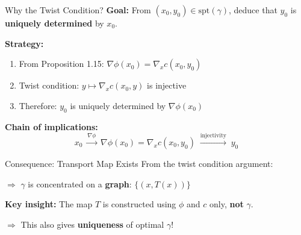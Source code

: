 \documentclass[aspectratio=169]{beamer}
\begin{document}
\begin{frame}{Why the Twist Condition?}
\textbf{Goal:} From $(x_0, y_0) \in \text{spt}(\gamma)$, deduce that $y_0$ is \textbf{uniquely determined} by $x_0$.

\vspace{0.4cm}
\textbf{Strategy:}
\begin{enumerate}
    \item From Proposition 1.15: $\nabla\phi(x_0) = \nabla_x c(x_0, y_0)$
    \item Twist condition: $y \mapsto \nabla_x c(x_0, y)$ is injective
    \item Therefore: $y_0$ is uniquely determined by $\nabla\phi(x_0)$
\end{enumerate}

\vspace{0.4cm}
\textbf{Chain of implications:}
\[
x_0 \;\xrightarrow{\nabla\phi}\; \nabla\phi(x_0) = \nabla_x c(x_0, y_0) \;\xrightarrow{\text{injectivity}}\; y_0
\]
\end{frame}

\begin{frame}{Consequence: Transport Map Exists}
From the twist condition argument:

$\Rightarrow$ $\gamma$ is concentrated on a \textbf{graph}: $\{(x, T(x))\}$

\vspace{0.3cm}
\begin{center}
\end{center}

\vspace{0.2cm}
\textbf{Key insight:} The map $T$ is constructed using $\phi$ and $c$ only, \textbf{not} $\gamma$.

$\Rightarrow$ This also gives \textbf{uniqueness} of optimal $\gamma$!
\end{frame}
\end{document}
